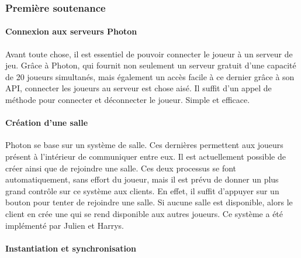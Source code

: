     
    \vspace{0.5cm}
    \subsubsection{Première soutenance}
    \vspace{0.5cm}

        \paragraph{Connexion aux serveurs Photon}

            Avant toute chose, il est essentiel de pouvoir connecter le joueur à un serveur de jeu.
            Grâce à Photon, qui fournit non seulement un serveur gratuit d'une capacité de 20 joueurs simultanés,
            mais également un accès facile à ce dernier grâce à son API, connecter les joueurs au serveur est chose
            aisé. Il suffit d'un appel de méthode pour connecter et déconnecter le joueur. Simple et efficace.


        \paragraph{Création d'une salle}

            Photon se base sur un système de salle. Ces dernières permettent aux joueurs présent à l'intérieur de communiquer entre eux.
            Il est actuellement possible de créer ainsi que de rejoindre une salle. Ces deux processus se font automatiquement, sans effort du joueur,
            mais il est prévu de donner un plus grand contrôle sur ce système aux clients.
            En effet, il suffit d'appuyer sur un bouton pour tenter de rejoindre une salle.
            Si aucune salle est disponible, alors le client en crée une qui se rend disponible aux autres joueurs.
            Ce système a été implémenté par Julien et Harrys.


        \paragraph{Instantiation et synchronisation}

